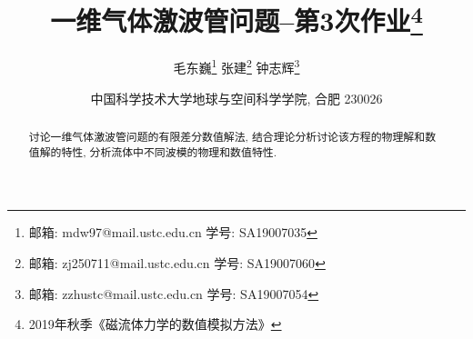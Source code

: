 \documentclass[10.5pt
]{article}
\begin{document}
\renewcommand{\refname}{参考文献}
\renewcommand{\figurename}{图}
\renewcommand{\abstractname}{摘要}

\title{一维气体激波管问题--第3次作业\footnote{2019年秋季《磁流体力学的数值模拟方法》}}

\author{
毛东巍\footnote{邮箱: mdw97@mail.ustc.edu.cn  学号: SA19007035}\quad 
张建\footnote{邮箱: zj250711@mail.ustc.edu.cn  学号: SA19007060}\quad 
钟志辉\footnote{邮箱: zzhustc@mail.ustc.edu.cn  学号: SA19007054}
}

\date{%
\scriptsize%
中国科学技术大学地球与空间科学学院, 合肥 230026
%
}

\maketitle

\begin{abstract}
讨论一维气体激波管问题的有限差分数值解法, 结合理论分析讨论该方程的物理解和数值解的特性,
分析流体中不同波模的物理和数值特性.
\end{abstract}
\end{document}
